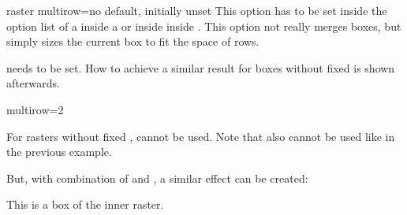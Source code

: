 \clearpage
\begin{docTcbKey}[][doc new=2016-02-19]{raster multirow}{=}{no default, initially unset}
  This option has to be set inside the option list of a 
  inside a  or inside  inside .
  This option not really merges boxes, but simply sizes the current box to fit
  the space of  rows.

  \begin{marker}
     needs  to be set.
    How to achieve a similar result for boxes without fixed 
    is shown afterwards.
  \end{marker}

\begin{dispExample}
\begin{tcbitemize}[raster rows=3,raster columns=3,raster height=6cm,
  raster every box/.style={colframe=red!50!black,colback=red!10!white}]
\tcbitem
\tcbitem
\tcbitem
\tcbitem[colframe=blue!50!black,colback=blue!10!white,raster multirow=2]
  multirow=2
\tcbitem[raster multicolumn=2,raster multirow=2,blankest]
  \begin{tcbitemize}[raster rows=2,raster columns=2,raster height=\tcbtextheight]
  \tcbitem
  \tcbitem
  \tcbitem
  \tcbitem
  \end{tcbitemize}
\end{tcbitemize}
\end{dispExample}


\clearpage
For rasters without fixed , 
cannot be used. Note that  also cannot be used like
in the previous example.

But, with combination of  and
, a similar effect can be created:

\begin{dispExample}
\begin{tcbitemize}[raster columns=3,raster equal height=rows,
  raster every box/.style={colframe=red!50!black,colback=red!10!white}]
\tcbitem
\tcbitem
\tcbitem
\tcbitem[colframe=blue!50!black,colback=blue!10!white]
 \lipsum[2]
\tcbitem[raster multicolumn=2,blankest,space to=\myspace]
  \begin{tcbitemize}[raster columns=2]
  \tcbitem This is a box of the inner raster.
  \tcbitem
  \tcbitem[height=\myspace]
  \tcbitem[height=\myspace]
  \end{tcbitemize}
\end{tcbitemize}
\end{dispExample}

\end{docTcbKey}



